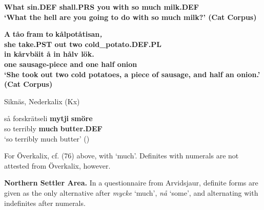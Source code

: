 \bfseries
What  sin.DEF  shall.PRS  you  with  so  much  milk.DEF\\

\glt ‘What the hell are you going to do with so \textbf{much milk}?’ (Cat Corpus)

\z

\item 


 \ea\label{}
\gll \textbf{A} \textbf{tåo} \textbf{fram} \textbf{to}\textbf{\textit{  }}\textbf{kålpotåtisan}\textbf{\textit{,}}\\

\bfseries
she  take.PST  out  two  cold\_potato.DEF.PL\\

 \ea\label{}
\gll in  kårvbäit  å  in  hålv  lök.\\


one  sausage-piece  and  one  half  onion\\

\glt ‘She took out two cold potatoes, a piece of sausage, and half an onion.’ (Cat Corpus)

\z

\item 

Siknäs, Nederkalix (Kx)



 \ea\label{}
\gll så  forskrätseli  \textbf{mytji} \textbf{smöre}\\


so  terribly  \textbf{much} \textbf{butter.DEF}\\

\glt ‘so terribly much butter’ (\citet{Stenberg1971})

\z

For Överkalix, cf. (76) above, with ‘much’. Definites with numerals are not attested from Överkalix, however.


\textbf{Northern Settler Area. }In a questionnaire from Arvidsjaur, definite forms are given as the only alternative after \textit{mycke} ‘much’, \textit{nå} ‘some’, and alternating with indefinites after numerals.

